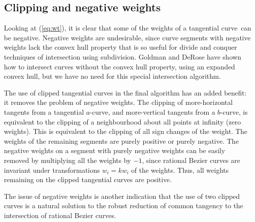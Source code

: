 \documentclass[9pt,twocolumn]{article}
\newcommand{\tang}{tangential curve\ }
\begin{document}
\subsection{Clipping and negative weights}
\label{sec:negative}

Looking at (\ref{eq:wt}),
it is clear that some of the weights of a \tang can be negative.
Negative weights are undesirable, 
since curve segments with negative weights
lack the convex hull property that is so useful for divide and conquer
techniques of intersection using subdivision.
Goldman and DeRose \cite{goldman86} have shown how to intersect curves without
the convex hull property, using an expanded convex hull,
but we have no need for this special intersection algorithm.

The use of clipped tangential curves in the final algorithm
has an added benefit:
it removes the problem of negative weights.
The clipping of more-horizontal tangents from a tangential $a$-curve,
and more-vertical tangents from a $b$-curve, is equivalent to the clipping 
of a neighbourhood about all points at infinity (zero weights).
This is equivalent to the clipping of all sign changes of the weight.
The weights of the remaining segments are purely positive or purely negative.  
The negative weights on a segment with purely negative weights can be easily
removed by multiplying all the weights by $-1$,
since rational Bezier curves are invariant under 
transformations $w_i = kw_i$ of the weights.
Thus, all weights remaining on the clipped tangential curves are positive.

The issue of negative weights is another indication that the use of two clipped
curves is a natural solution to the robust reduction of common tangency
to the intersection of rational Bezier curves.
\end{document}

